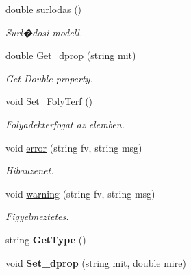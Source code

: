 \begin{DoxyCompactItemize}
\hypertarget{class_csatorna_a8ca44a377b12883ddad100f0dea9aed2}{}\label{class_csatorna_a8ca44a377b12883ddad100f0dea9aed2} 
double \hyperlink{class_csatorna_a8ca44a377b12883ddad100f0dea9aed2}{surlodas} ()
\begin{DoxyCompactList}\small\item\em Surl�dosi modell. \end{DoxyCompactList}\item 
\hypertarget{class_csatorna_a581b69e57becd825b645f07b07028051}{}\label{class_csatorna_a581b69e57becd825b645f07b07028051} 
double \hyperlink{class_csatorna_a581b69e57becd825b645f07b07028051}{Get\+\_\+dprop} (string mit)
\begin{DoxyCompactList}\small\item\em Get Double property. \end{DoxyCompactList}\item 
\hypertarget{class_csatorna_a4d75a74c04c6a66600068e98f055f2b4}{}\label{class_csatorna_a4d75a74c04c6a66600068e98f055f2b4} 
void \hyperlink{class_csatorna_a4d75a74c04c6a66600068e98f055f2b4}{Set\+\_\+\+Foly\+Terf} ()
\begin{DoxyCompactList}\small\item\em Folyadekterfogat az elemben. \end{DoxyCompactList}\item 
void \hyperlink{class_csatorna_a765dd9b66d2a18b567a6045d17266a10}{error} (string fv, string msg)
\begin{DoxyCompactList}\small\item\em Hibauzenet. \end{DoxyCompactList}\item 
void \hyperlink{class_csatorna_ac2000669171af7d8fa5f447cb8aa231d}{warning} (string fv, string msg)
\begin{DoxyCompactList}\small\item\em Figyelmeztetes. \end{DoxyCompactList}\item 
\hypertarget{class_csatorna_a6b1b895f6b560b8bb3a517c48b12210e}{}\label{class_csatorna_a6b1b895f6b560b8bb3a517c48b12210e} 
string {\bfseries Get\+Type} ()
\item 
\hypertarget{class_csatorna_aa1895b07dd2d4b836f0efbe0869cd4e1}{}\label{class_csatorna_aa1895b07dd2d4b836f0efbe0869cd4e1} 
void {\bfseries Set\+\_\+dprop} (string mit, double mire)
\item 
\hypertarget{class_csatorna_a0b0b43ad04feb2e0cf60a6d027387ff9}{}\label{class_csatorna_a0b0b43ad04feb2e0cf60a6d027387ff9} 

\end{DoxyCompactItemize}
